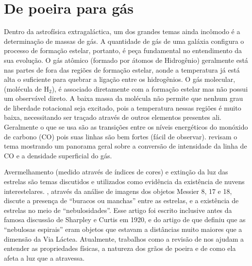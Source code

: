 \section{De poeira para gás}
\label{sec:intro:dust2gas}

Dentro da astrofísica extragaláctica, um dos grandes temas ainda incômodo é a determinação de massas
de gás. A quantidade de gás de uma galáxia configura o processo de formação estelar, portanto, é
peça fundamental no entendimento da sua evolução. O gás atômico (formado por átomos de Hidrogênio)
geralmente está nas partes de fora das regiões de formação estelar, aonde a temperatura já está alta
o suficiente para quebrar a ligação entre os hidrogênios. O gás molecular, (molécula de
$\mathrm{H}_2$), é associado diretamente com a formação estelar mas não possui um observável direto.
A baixa massa da molécula não permite que nenhum grau de liberdade rotacional seja excitado, pois a
temperatura nessas regiões é muito baixa, necessitando ser traçado através de outros elementos
presentes ali. Geralmente o que se usa são as transições entre os níveis energéticos do monóxido de
carbono (CO) pois suas linhas são bem fortes (fácil de observar). \citet{Bolatto.etal.2013a} revisam
o tema mostrando um panorama geral sobre a conversão de intensidade da linha de CO e a densidade
superficial do gás.

Avermelhamento (medido através de índices de cores) e extinção da luz das estrelas são temas
discutidos e utilizados como evidência da existência de nuvens interestelares.
\citet{Barnard.1908a}, através da análise de imagens dos objetos Messier 8, 17 e 18, discute a
presença de ``buracos ou manchas'' entre as estrelas, e a existência de estrelas no meio de
``nebulosidades''. Esse artigo foi escrito inclusive antes da famosa discussão de Sharpley e Curtis
em 1920, e do artigo de \citet{Hubble.1925a} que definiu que as ``nebulosas espirais'' eram objetos
que estavam a distâncias muito maiores que a dimensão da Via Láctea. Atualmente, trabalhos como a
revisão de \citet{Draine.2003a} nos ajudam a entender as propriedades físicas, a natureza dos
grãos de poeira e de como ela afeta a luz que a atravessa.

